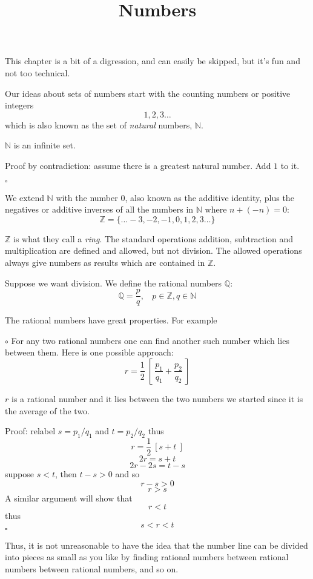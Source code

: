 \documentclass[11pt, oneside]{article}
\title{Numbers}
\date{}
\begin{document}
\maketitle
\Large
This chapter is a bit of a digression, and can easily be skipped, but it's fun and not too technical.

Our ideas about sets of numbers start with the counting numbers or positive integers
\[ 1, 2, 3 \dots \]
which is also known as the set of \emph{natural} numbers, $\mathbb{N}$.

$\mathbb{N}$ is an infinite set.  

Proof by contradiction:  assume there is a greatest natural number.  Add $1$ to it.  

$\square$

We extend $\mathbb{N}$ with the number $0$, also known as the additive identity, plus the negatives or additive inverses of all the numbers in $\mathbb{N}$ where $n + (-n) = 0$:
\[ \mathbb{Z} = \{ \dots - 3, -2, -1 , 0 , 1, 2, 3 \dots \} \]

$\mathbb{Z}$ is what they call a \emph{ring}.  The standard operations addition, subtraction and multiplication are defined and allowed, but not division. The allowed operations always give numbers as results which are contained in $\mathbb{Z}$.

Suppose we want division.  We define the rational numbers $\mathbb{Q}$:
\[ \mathbb{Q} = \frac{p}{q}, \ \ \ \  p \in \mathbb{Z}, q \in \mathbb{N} \]

The rational numbers have great properties.  For example

$\circ$  For any two rational numbers one can find another such number which lies between them.  Here is one possible approach:
\[ r = \frac{1}{2} \ [ \ \frac{p_1}{q_1} +  \frac{p_2}{q_2} \ ] \]

$r$ is a rational number and it lies between the two numbers we started since it is the average of the two.  

Proof:  relabel $s = p_1/q_1$ and $t = p_2/q_2$ thus
\[ r = \frac{1}{2} \ [ s + t \ ] \]
\[ 2r = s + t \]
\[ 2r - 2s = t - s \]
suppose $s < t$, then $t - s > 0$ and so
\[ r - s > 0 \]
\[ r  > s \]
A similar argument will show that
\[ r < t \]
thus
\[ s < r < t \]
$\square$
  
Thus, it is not unreasonable to have the idea that the number line can be divided into pieces as small as you like by finding rational numbers between rational numbers between rational numbers, and so on.
\end{document}
